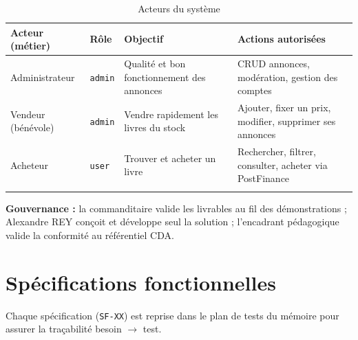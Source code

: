 \documentclass[10pt, a4paper]{article}
\begin{document}
\begin{longtable}{@{}L{2.6cm}L{1.6cm}L{3.9cm}L{6cm}@{}}
\toprule
\textbf{Acteur (métier)} & \textbf{Rôle} & \textbf{Objectif} & \textbf{Actions autorisées} \\
\midrule
\endhead
Administrateur & \texttt{admin} & Qualité et bon fonctionnement des annonces & CRUD annonces, modération, gestion des comptes \\
Vendeur (bénévole) & \texttt{admin} & Vendre rapidement les livres du stock & Ajouter, fixer un prix, modifier, supprimer ses annonces \\
Acheteur & \texttt{user} & Trouver et acheter un livre & Rechercher, filtrer, consulter, acheter via PostFinance \\
\bottomrule
\caption{Acteurs du système}
\end{longtable}

\noindent\textbf{Gouvernance :} la commanditaire valide les livrables au fil des démonstrations ; Alexandre REY
conçoit et développe seul la solution ; l'encadrant pédagogique valide la conformité au
référentiel CDA.

\section{Spécifications fonctionnelles}

Chaque spécification (\texttt{SF-XX}) est reprise dans le plan de tests du mémoire pour
assurer la traçabilité besoin $\rightarrow$ test.
\end{document}
